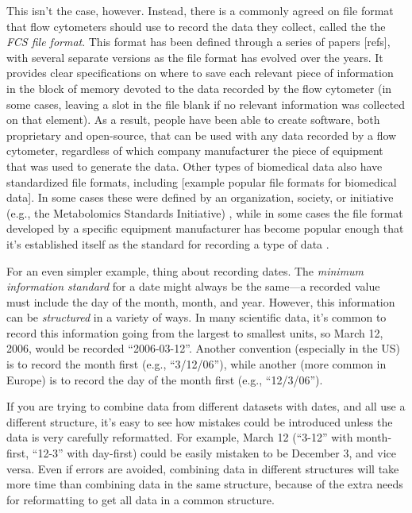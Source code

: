 \documentclass[]{tufte-book}
\begin{document}
This isn't the case, however. Instead, there is a commonly agreed on file
format that flow cytometers should use to record the data they collect, called
the the \emph{FCS file format}. This format has been defined through a series of
papers {[}refs{]}, with several separate versions as the file format has evolved
over the years. It provides clear specifications on where to save each relevant
piece of information in the block of memory devoted to the data recorded by the
flow cytometer (in some cases, leaving a slot in the file blank if no relevant
information was collected on that element). As a result, people have been able
to create software, both proprietary and open-source, that can be used with any
data recorded by a flow cytometer, regardless of which company manufacturer the
piece of equipment that was used to generate the data. Other types of biomedical
data also have standardized file formats, including {[}example popular file
formats for biomedical data{]}. In some cases these were defined by an
organization, society, or initiative (e.g., the Metabolomics Standards
Initiative) \citep{ghosh2011software}, while in some cases the file format developed
by a specific equipment manufacturer has become popular enough that it's
established itself as the standard for recording a type of data
\citep{brazma2006standards}.

For an even simpler example, thing about recording dates. The \emph{minimum
information standard} for a date might always be the same---a recorded value
must include the day of the month, month, and year. However, this information
can be \emph{structured} in a variety of ways. In many scientific data, it's common
to record this information going from the largest to smallest units, so March
12, 2006, would be recorded ``2006-03-12''. Another convention (especially in the
US) is to record the month first (e.g., ``3/12/06''), while another (more common
in Europe) is to record the day of the month first (e.g., ``12/3/06'').

If you are trying to combine data from different datasets with dates, and all
use a different structure, it's easy to see how mistakes could be introduced
unless the data is very carefully reformatted. For example, March 12 (``3-12''
with month-first, ``12-3'' with day-first) could be easily mistaken to be December
3, and vice versa. Even if errors are avoided, combining data in different
structures will take more time than combining data in the same structure,
because of the extra needs for reformatting to get all data in a common
structure.
\end{document}
